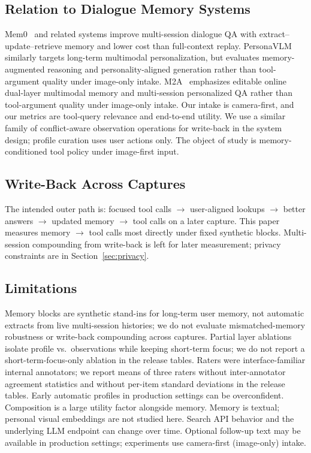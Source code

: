 \documentclass[11pt,a4paper]{article}
\begin{document}
\subsection{Relation to Dialogue Memory Systems}

Mem0~\cite{mem0} and related systems improve multi-session dialogue QA with extract--update--retrieve memory and lower cost than full-context replay. PersonaVLM~\cite{personavlm} similarly targets long-term multimodal personalization, but evaluates memory-augmented reasoning and personality-aligned generation rather than tool-argument quality under image-only intake. M2A~\cite{m2a} emphasizes editable online dual-layer multimodal memory and multi-session personalized QA rather than tool-argument quality under image-only intake. Our intake is camera-first, and our metrics are tool-query relevance and end-to-end utility. We use a similar family of conflict-aware observation operations for write-back in the system design; profile curation uses user actions only. The object of study is memory-conditioned tool policy under image-first input.

\subsection{Write-Back Across Captures}

The intended outer path is: focused tool calls $\rightarrow$ user-aligned lookups $\rightarrow$ better answers $\rightarrow$ updated memory $\rightarrow$ tool calls on a later capture. This paper measures memory $\rightarrow$ tool calls most directly under fixed synthetic blocks. Multi-session compounding from write-back is left for later measurement; privacy constraints are in Section~\ref{sec:privacy}.

\subsection{Limitations}

Memory blocks are synthetic stand-ins for long-term user memory, not automatic extracts from live multi-session histories; we do not evaluate mismatched-memory robustness or write-back compounding across captures. Partial layer ablations isolate profile vs.\ observations while keeping short-term focus; we do not report a short-term-focus-only ablation in the release tables. Raters were interface-familiar internal annotators; we report means of three raters without inter-annotator agreement statistics and without per-item standard deviations in the release tables. Early automatic profiles in production settings can be overconfident. Composition is a large utility factor alongside memory. Memory is textual; personal visual embeddings are not studied here. Search API behavior and the underlying LLM endpoint can change over time. Optional follow-up text may be available in production settings; experiments use camera-first (image-only) intake.
\end{document}
